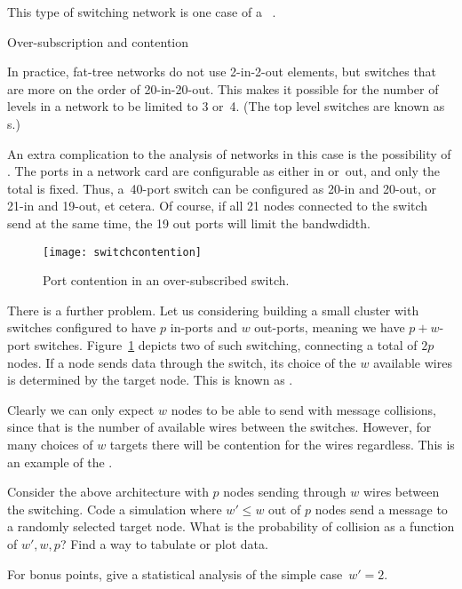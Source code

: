 This type of switching network is one case of a ~\cite{Clos1953}.


 {Over-subscription and contention}

In practice, fat-tree networks do not use 2-in-2-out elements,
but switches that are more on the order of 20-in-20-out.
This makes it possible for the number of levels in a network to
be limited to 3 or~4.
(The top level switches are known as s.)

An extra complication to the analysis of networks in this case
is the possibility of
.
The ports in a network card are configurable as either in or~out,
and only the total is fixed.
Thus, a~40-port switch can be configured as 20-in and 20-out,
or 21-in and 19-out, et cetera.
Of course, if all 21 nodes connected to the switch send at the same time,
the 19 out ports will limit the bandwdidth.

\begin{figure}[th]
  \texttt{[image: switchcontention]}  
  \caption{Port contention in an over-subscribed switch.}
  \label{fig:switchcontention}
\end{figure}

There is a further problem.
Let us considering building a small cluster with switches
configured to have $p$ in-ports and $w$ out-ports,
meaning we have $p+w$-port switches.
Figure~\ref{fig:switchcontention} depicts two of such switching,
connecting a total of $2p$ nodes.
If a node sends data through the switch,
its choice of the $w$ available wires is determined
by the target node.
This is known as .

Clearly we can only expect $w$ nodes to be able to send
with message collisions, since that is the number of available
wires between the switches.
However, for many choices of $w$ targets there will be
contention for the wires regardless.
This is an example of the .

\begin{exercise}
  Consider the above architecture with $p$ nodes sending through $w$ wires between
  the switching.
  Code a simulation where $w'\leq w$ out of $p$ nodes send a message to a randomly
  selected target node.
  What is the probability of collision as a function of $w',w,p$?
  Find a way to tabulate or plot data.

  For bonus points, give a statistical analysis of the simple case~$w'=2$.

\end{exercise}

